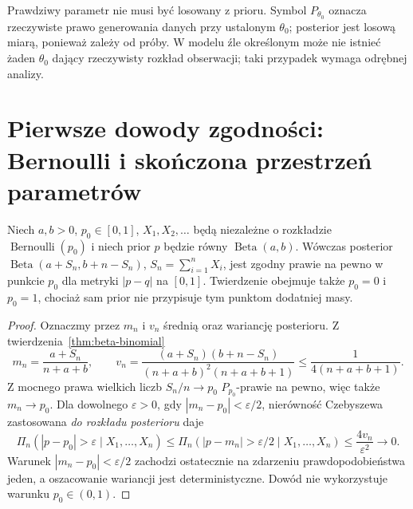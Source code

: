 \begin{uwaga}
Prawdziwy parametr nie musi być losowany z prioru.
Symbol $P_{\theta_0}$ oznacza rzeczywiste prawo generowania
danych przy ustalonym $\theta_0$; posterior jest losową
miarą, ponieważ zależy od próby. W modelu źle określonym
może nie istnieć żaden $\theta_0$ dający rzeczywisty rozkład
obserwacji; taki przypadek wymaga odrębnej analizy.
\end{uwaga}

\section{Pierwsze dowody zgodności: Bernoulli i skończona przestrzeń parametrów}
\begin{twierdzenie}
\label{thm:beta-posterior-consistency}
Niech $a,b>0$, $p_0\in[0,1]$, $X_1,X_2,\ldots$
będą niezależne o rozkładzie $\operatorname{Bernoulli}(p_0)$
i niech prior $p$ będzie równy $\operatorname{Beta}(a,b)$.
Wówczas posterior $\operatorname{Beta}(a+S_n,b+n-S_n)$,
$S_n=\sum_{i=1}^nX_i$, jest zgodny prawie na pewno
w punkcie $p_0$ dla metryki $|p-q|$ na $[0,1]$.
Twierdzenie obejmuje także $p_0=0$ i $p_0=1$,
chociaż sam prior nie przypisuje tym punktom dodatniej masy.
\end{twierdzenie}
\begin{proof}
Oznaczmy przez $m_n$ i $v_n$ średnią oraz wariancję
posterioru. Z twierdzenia~\ref{thm:beta-binomial}
\[
 m_n=\frac{a+S_n}{n+a+b},\qquad
 v_n=\frac{(a+S_n)(b+n-S_n)}{(n+a+b)^2(n+a+b+1)}
 \le\frac1{4(n+a+b+1)}.
\]
Z mocnego prawa wielkich liczb $S_n/n\to p_0$
$P_{p_0}$-prawie na pewno, więc także $m_n\to p_0$.
Dla dowolnego $\varepsilon>0$, gdy
$|m_n-p_0|<\varepsilon/2$, nierówność Czebyszewa
zastosowana \emph{do rozkładu posterioru} daje
\[
 \Pi_n(|p-p_0|>\varepsilon\mid X_1,\ldots,X_n)
 \le\Pi_n(|p-m_n|>\varepsilon/2\mid X_1,\ldots,X_n)
 \le\frac{4v_n}{\varepsilon^2}\longrightarrow0.
\]
Warunek $|m_n-p_0|<\varepsilon/2$ zachodzi ostatecznie
na zdarzeniu prawdopodobieństwa jeden, a oszacowanie
wariancji jest deterministyczne. Dowód nie wykorzystuje
warunku $p_0\in(0,1)$.
\end{proof}

